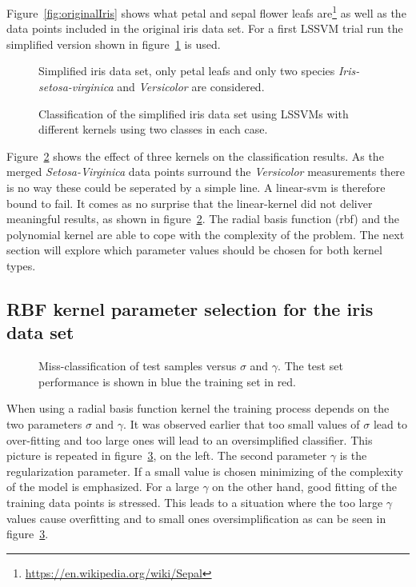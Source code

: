 Figure~\ref{fig:originalIris} shows what petal and sepal flower leafs are\footnote{\url{https://en.wikipedia.org/wiki/Sepal}} as well as the data points included in the original iris data set. For a first LSSVM trial run the simplified version shown in figure~\ref{fig:simpleIris} is used. 
\begin{figure}
\centering

\caption{Simplified iris data set, only petal leafs and only two species \textit{Iris-setosa-virginica} and \textit{Versicolor} are considered.}
\label{fig:simpleIris}
\end{figure}
\begin{figure}
\centering



\caption{Classification of the simplified iris data set using LSSVMs with different kernels using two classes in each case.}
\label{fig:linRBFPoly}
\end{figure}
Figure~\ref*{fig:linRBFPoly} shows the effect of three kernels on the classification results. As the merged \textit{Setosa-Virginica} data points surround the \textit{Versicolor} measurements there is no way these could be seperated by a simple line. A linear-svm is therefore bound to fail. It comes as no surprise that the linear-kernel did not deliver meaningful results, as shown in figure~\ref{fig:linRBFPoly}. The radial basis function (rbf) and the polynomial kernel are able to cope with the complexity of the problem. The next section will explore which parameter values should be chosen for both kernel types.

\subsection{RBF kernel parameter selection for the iris data set}
\begin{figure}
\centering


\caption{Miss-classification of test samples versus $\sigma$ and $\gamma$. The test set performance is shown in blue the training set in red.}
\label{fig:rbfSigmaGamma}
\end{figure}
When using a radial basis function kernel the training process depends on the two parameters $\sigma$ and $\gamma$. It was observed earlier that too small values of $\sigma$ lead to over-fitting and too large ones will lead to an oversimplified classifier. This picture is repeated in figure~\ref{fig:rbfSigmaGamma}, on the left. The second parameter $\gamma$  is the regularization parameter. If a small value is chosen minimizing of the complexity of the model is emphasized. For a large $\gamma$ on the other hand, good fitting
of the training data points is stressed. This leads to a situation where the too large $\gamma$ values cause overfitting and to small ones oversimplification as can be seen in figure~\ref*{fig:rbfSigmaGamma}. 

